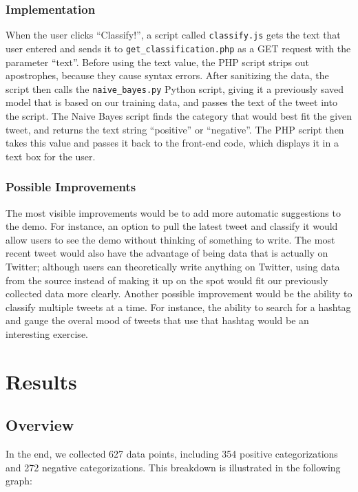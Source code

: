 \documentclass[12pt,a4paper]{article}
\begin{document}
\subsubsection{Implementation}
When the user clicks ``Classify!'', a script called \texttt{classify.js} gets the text that user entered and sends it to \texttt{get\_classification.php} as a GET request with the parameter ``text''. Before using the text value, the PHP script strips out apostrophes, because they cause syntax errors. After sanitizing the data, the script then calls the \texttt{naive\_bayes.py} Python script, giving it a previously saved model that is based on our training data, and passes the text of the tweet into the script. The Naive Bayes script finds the category that would best fit the given tweet, and returns the text string ``positive'' or ``negative''. The PHP script then takes this value and passes it back to the front-end code, which displays it in a text box for the user.

\subsubsection{Possible Improvements}
The most visible improvements would be to add more automatic suggestions to the demo. For instance, an option to pull the latest tweet and classify it would allow users to see the demo without thinking of something to write. The most recent tweet would also have the advantage of being data that is actually on Twitter; although users can theoretically write anything on Twitter, using data from the source instead of making it up on the spot would fit our previously collected data more clearly. Another possible improvement would be the ability to classify multiple tweets at a time. For instance, the ability to search for a hashtag and gauge the overal mood of tweets that use that hashtag would be an interesting exercise.

\section { Results }

\subsection{Overview}

In the end, we collected 627 data points, including 354 positive categorizations and 272 negative categorizations. This breakdown is illustrated in the following graph:
\end{document}
